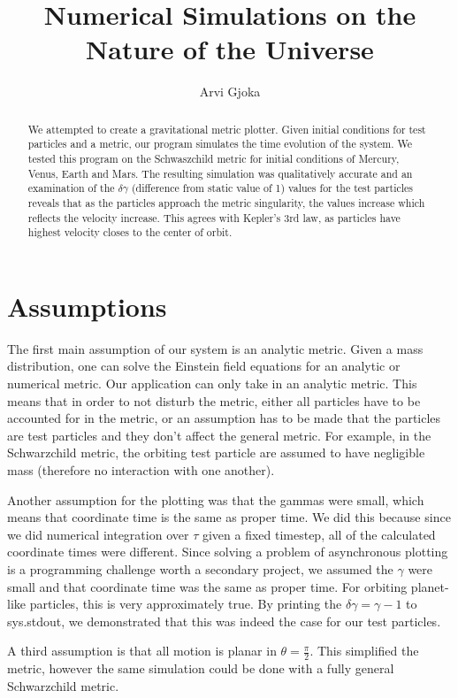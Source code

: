 \documentclass[12pt]{article}
\title{Numerical Simulations on the Nature of the Universe}
\date{}
\author{Arvi Gjoka}
\begin{document}
\maketitle

\begin{abstract}
We attempted to create a gravitational metric plotter. Given initial conditions for test particles and a metric, our program simulates the time evolution of the system. We tested this program on the Schwaszchild metric for initial conditions of Mercury, Venus, Earth and Mars. The resulting simulation was qualitatively accurate and an examination of the $\delta \gamma$ (difference from static value of 1) values for  the test particles reveals that as the particles approach the metric singularity, the values increase which reflects the velocity increase. This agrees with Kepler's 3rd law, as particles have highest velocity closes to the center of orbit.
\end{abstract}

\section*{Assumptions}
The first main assumption of our system is an analytic metric. Given a mass distribution, one can solve the Einstein field equations for an analytic or numerical metric. Our application can only take in an analytic metric. This means that in order to not disturb the metric, either all particles have to be accounted for in the metric, or an assumption has to be made that the particles are test particles and they don't affect the general metric. For example, in the Schwarzchild metric, the orbiting test particle are assumed to have negligible mass (therefore no interaction with one another).

Another assumption for the plotting was that the gammas were small, which means that coordinate time is the same as proper time. We did this because since we did numerical integration over $\tau$ given a fixed timestep, all of the calculated coordinate times were different. Since solving a problem of asynchronous plotting is a programming challenge worth a secondary project, we assumed the $\gamma$ were small and that coordinate time was the same as proper time. For orbiting planet-like particles, this is very approximately true. By printing the $\delta \gamma = \gamma - 1$ to sys.stdout, we demonstrated that this was indeed the case for our test particles.

A third assumption is that all motion is planar in $\theta = \frac{\pi}{2}$. This simplified the metric, however the same simulation could be done with a fully general Schwarzchild metric.
\end{document}
